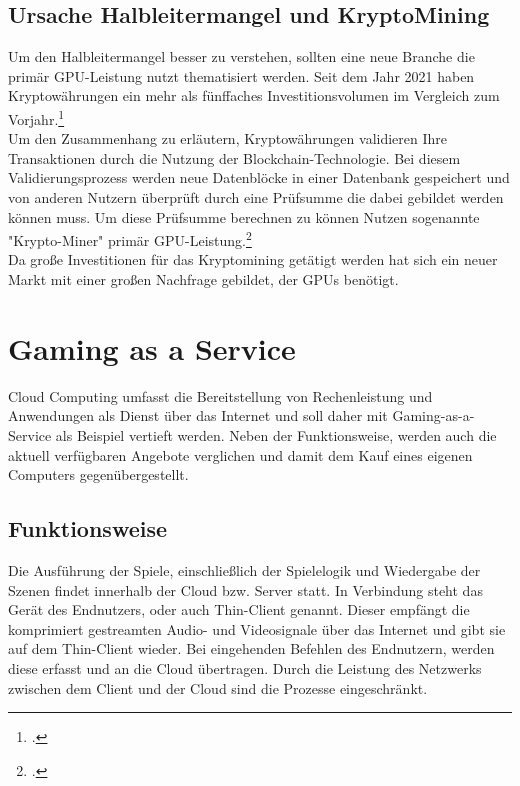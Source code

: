 \documentclass[12pt,toc=bib,toc=listof]{scrreprt}
\begin{document}
\section{Ursache Halbleitermangel und KryptoMining}
\label{sec:Ursache Halbleitermangel und KryptoMining}

Um den Halbleitermangel besser zu verstehen, sollten eine neue Branche die primär GPU-Leistung 
nutzt thematisiert werden. Seit dem Jahr 2021 haben Kryptowährungen ein mehr als fünffaches Investitionsvolumen
im Vergleich zum Vorjahr.\footcite [] [] {Statista_Research_1}
\\Um den Zusammenhang zu erläutern, Kryptowährungen validieren Ihre Transaktionen durch die Nutzung der 
Blockchain-Technologie. Bei diesem Validierungsprozess werden neue Datenblöcke in einer Datenbank gespeichert und von anderen
Nutzern überprüft durch eine Prüfsumme die dabei gebildet werden können muss. Um diese Prüfsumme berechnen zu können
Nutzen sogenannte "Krypto-Miner" primär GPU-Leistung.\footcite [Vgl.] [S.259-273] {Arslanian.2022}
\\Da große Investitionen für das Kryptomining getätigt werden hat sich ein neuer Markt mit einer großen Nachfrage gebildet, der
GPUs benötigt.
\\

\chapter{Gaming as a Service}
\label{sec: Gaming as a Service}

Cloud Computing umfasst die Bereitstellung von Rechenleistung und Anwendungen als Dienst über das Internet und soll daher mit Gaming-as-a-Service als Beispiel vertieft werden. Neben der Funktionsweise, werden auch die aktuell verfügbaren Angebote verglichen und damit dem Kauf eines eigenen Computers gegenübergestellt.

\section{Funktionsweise}
\label{sec:Funktionsweise}

Die Ausführung der Spiele, einschließlich der Spielelogik und Wiedergabe der Szenen findet innerhalb der Cloud bzw. Server statt. In Verbindung steht das Gerät des Endnutzers, oder auch Thin-Client genannt. Dieser empfängt die komprimiert gestreamten Audio- und Videosignale über das Internet und gibt sie auf dem Thin-Client wieder. Bei eingehenden Befehlen des Endnutzern, werden diese erfasst und an die Cloud übertragen. Durch die Leistung des Netzwerks zwischen dem Client und der Cloud sind die Prozesse eingeschränkt.
\end{document}
